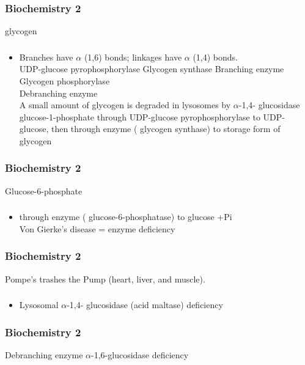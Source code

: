 \documentclass[11pt]{beamer}
\begin{document}
\begin{frame}
 \frametitle{Biochemistry 2}
glycogen 
\end{frame}

\begin{frame}
 \frametitle{}
\begin{itemize}
\item Branches have ${\alpha}$ (1,6) bonds; linkages have ${\alpha}$ (1,4) bonds. \\  UDP-glucose pyrophosphorylase  Glycogen synthase  Branching enzyme  Glycogen phosphorylase \\  Debranching enzyme \\ A small amount of glycogen is degraded in lysosomes by ${\alpha}$-1,4- glucosidase \\ glucose-1-phosphate through UDP-glucose pyrophosphorylase to UDP-glucose, then through enzyme ( glycogen synthase) to storage form of glycogen 
\end{itemize}
\end{frame}

\begin{frame}
 \frametitle{Biochemistry 2}
Glucose-6-phosphate 
\end{frame}

\begin{frame}
 \frametitle{}
\begin{itemize}
\item through enzyme ( glucose-6-phosphatase) to glucose +Pi \\ Von Gierke’s disease = enzyme deficiency 
\end{itemize}
\end{frame}

\begin{frame}
 \frametitle{Biochemistry 2}
Pompe’s trashes the Pump (heart, liver, and muscle).
\end{frame}

\begin{frame}
 \frametitle{}
\begin{itemize}
\item Lysosomal ${\alpha}$-1,4- glucosidase (acid maltase) deficiency 
\end{itemize}
\end{frame}

\begin{frame}
 \frametitle{Biochemistry 2}
Debranching enzyme ${\alpha}$-1,6-glucosidase deficiency 
\end{frame}
\end{document}
